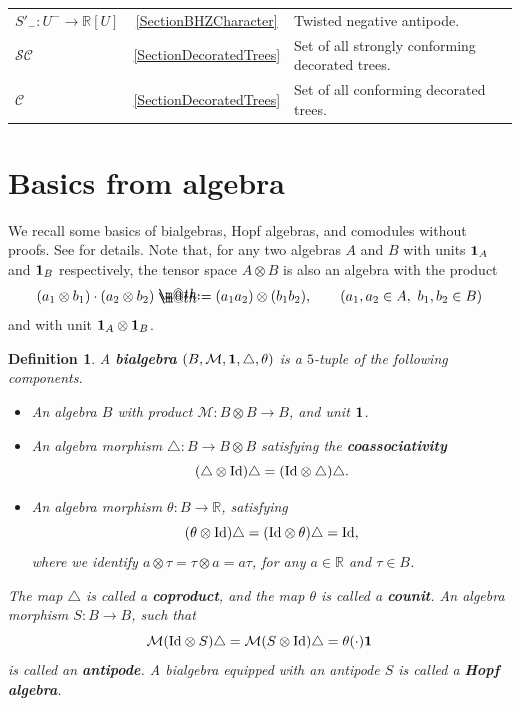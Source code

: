 \documentclass[10pt, reqno]{amsart}
\makeatletter
\numberwithin{subsection}{section}
\numberwithin{subsubsection}{subsection}
\numberwithin{equation}{section} %
\theoremstyle{mystyle}
\theoremstyle{mystyle2}
\newtheorem*{defn*} {Definition}
\theoremstyle{mystyle3}
\newcommand{\iden}{\text{\rm Id}}
\newcommand\bbR{\mathbb{R}}
\newcommand{\mcM}{\mathcal{M}}
\newcommand*{\defeq}{\mathrel{\rlap{%
                     \raisebox{0.3ex}{$\m@th\cdot$}}%
                     \raisebox{-0.3ex}{$\m@th\cdot$}}%
                     =}
\makeatother
\begin{document}
\begin{center}
{\begin{tabular}{l|c|l}
$S'_- : U^- \rightarrow \bbR[U]$ & {\sf \ref{SectionBHZCharacter}}  &  Twisted negative antipode.   \\

$\mathcal{SC}$  &  {\sf \ref{SectionDecoratedTrees}}   & Set of all strongly conforming decorated trees.   \\
$\mathcal{C}$  &   {\sf \ref{SectionDecoratedTrees}}  & Set of all conforming decorated trees.   \\
\hline
\end{tabular}   }
\end{center}  



\bigskip



\section{Basics from algebra}
\label{SectionAppendixAlgebra}

We recall some basics of bialgebras, Hopf algebras, and comodules without 
proofs. See \cite{Sweedler, Manchon, Foissy16} for details. Note that, for any two algebras $A$ and $B$ with units ${\bf1}_A$ and ${\bf1}_B$ respectively, the tensor space $A\otimes B$ is also an algebra with the product
$$
(a_1\otimes b_1)\cdot(a_2\otimes b_2) \defeq  (a_1a_2)\otimes(b_1b_2),
\qquad(a_1,a_2\in A, \ b_1,b_2\in B)
$$
and with unit ${\bf1}_A\otimes{\bf1}_B$.

\medskip

\begin{defn*}

A \textbf{\textsf{bialgebra}} $(B,\mcM,{\bf1},\triangle,\theta)$ is a $5$-tuple of the following components.

\begin{itemize}
\setlength{\itemsep}{1pt}
\item An algebra $B$ with product $\mcM:B\otimes B\to B$, and unit ${\bf1}$.
\item An algebra morphism $\triangle: B\to B\otimes B$ satisfying the \textbf{\textsf{coassociativity}}
$$
(\triangle\otimes\iden)\triangle=(\iden\otimes\triangle)\triangle.
$$
\item An algebra morphism $\theta:B\to\bbR$, satisfying
$$
(\theta\otimes\iden)\triangle = (\iden\otimes\theta)\triangle = \iden,
$$
where we identify $a\otimes\tau=\tau\otimes a=a\tau$, for any $a\in\bbR$ and $\tau\in B$.
\end{itemize}
The map $\triangle$ is called a \textbf{\textsf{coproduct}}, and the map $\theta$ is called a \textbf{\textsf{counit}}. An algebra morphism $S:B\to B$, such that
\begin{equation} \label{EqDefnAntipode}
\mcM(\iden\otimes S)\triangle = \mcM(S\otimes\iden)\triangle = \theta(\cdot){\bf1}
\end{equation}
is called an \textbf{\textsf{antipode}}. A bialgebra equipped with an antipode $S$ is called a \textbf{\textsf{Hopf algebra}}.

\end{defn*}
\end{document}
